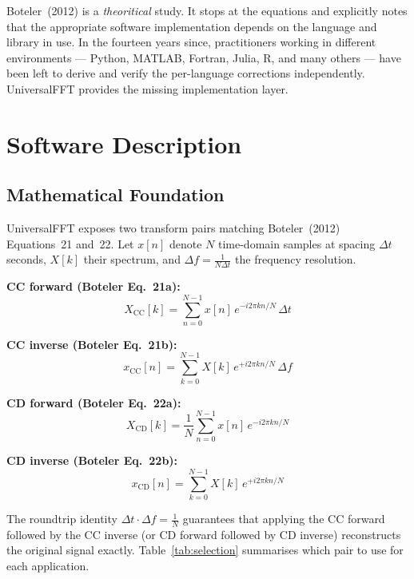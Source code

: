 \documentclass[12pt,a4paper]{article}
\begin{document}
Boteler~(2012) is a \emph{theoritical} study. It stops at the equations and explicitly
notes that the appropriate software implementation depends on the language and
library in use. In the fourteen years since, practitioners working in different
environments --- Python, MATLAB, Fortran, Julia, R, and many others --- have been left
to derive and verify the per-language corrections independently. UniversalFFT
provides the missing implementation layer.

\section{Software Description}

\subsection{Mathematical Foundation}

UniversalFFT exposes two transform pairs matching Boteler~(2012) Equations~21
and~22. Let $x[n]$ denote $N$ time-domain samples at spacing $\Delta t$ seconds,
$X[k]$ their spectrum, and $\Delta f = \frac{1}{N\Delta t}$ the frequency resolution.

\textbf{CC forward (Boteler Eq.\ 21a):}
\begin{equation}
  X_{\mathrm{CC}}[k] = \sum_{n=0}^{N-1} x[n]\,e^{-i2\pi kn/N}\,\Delta t
\end{equation}

\textbf{CC inverse (Boteler Eq.\ 21b):}
\begin{equation}
  x_{\mathrm{CC}}[n] = \sum_{k=0}^{N-1} X[k]\,e^{+i2\pi kn/N}\,\Delta f
\end{equation}

\textbf{CD forward (Boteler Eq.\ 22a):}
\begin{equation}
  X_{\mathrm{CD}}[k] = \frac{1}{N}\sum_{n=0}^{N-1} x[n]\,e^{-i2\pi kn/N}
\end{equation}

\textbf{CD inverse (Boteler Eq.\ 22b):}
\begin{equation}
  x_{\mathrm{CD}}[n] = \sum_{k=0}^{N-1} X[k]\,e^{+i2\pi kn/N}
\end{equation}

The roundtrip identity $\Delta t \cdot \Delta f = \frac{1}{N}$ guarantees that applying
the CC forward followed by the CC inverse (or CD forward followed by CD inverse)
reconstructs the original signal exactly. Table~\ref{tab:selection} summarises
which pair to use for each application.
\end{document}
